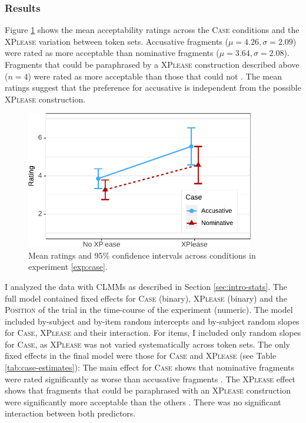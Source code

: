 \subsubsection{Results}\label{sec:fragments-case-rating-results}
\begin{sloppypar}
Figure \ref{fig:case-estimates} shows the mean acceptability ratings across the \textsc{Case} conditions and the \textsc{XPlease} variation between token sets. Accusative fragments (${\mu=4.26},\allowbreak {\sigma=2.09}$) were rated as more acceptable than nominative fragments (${\mu=3.64},\allowbreak{\sigma=2.08}$). Fragments that could be paraphrased by a \textsc{XPlease} construction described above ($n = 4$) were rated as more acceptable  than those that could not . The mean ratings suggest that the preference for accusative is independent from the possible \textsc{XPlease} construction.
\end{sloppypar}

\begin{figure}
\includegraphics[width=10cm]{figures/ex1_case_estimates}
 \caption{Mean ratings and 95\% confidence intervals across conditions in experiment \ref{exp:case}. \label{fig:case-estimates}}
\end{figure}

I analyzed the data with CLMMs as described in Section \ref{sec:intro-stats}. The full model contained fixed effects for \textsc{Case} (binary), \textsc{XPlease} (binary) and the \textsc{Position} of the trial in the time-course of the experiment (numeric). The model included by-subject and by-item random intercepts and by-subject random slopes for \textsc{Case}, \textsc{XPlease} and their interaction. For items, I included only random slopes for \textsc{Case}, as \textsc{XPlease} was not varied systematically across token sets. The only fixed effects in the final model were those for \textsc{Case} and \textsc{XPlease} (see Table \ref{tab:case-estimates}): The main effect for \textsc{Case} shows that nominative fragments were rated significantly as worse than accusative fragments . The \textsc{XPlease} effect shows that fragments that could be paraphrased with an \textsc{XPlease} construction were significantly more acceptable than the others . There was no significant interaction between both predictors.


